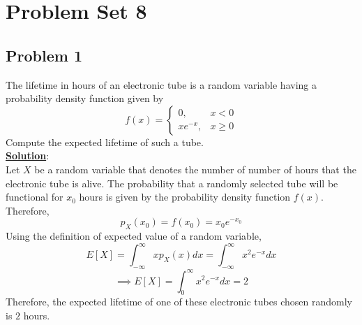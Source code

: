 \documentclass[11pt,letter paper]{report}
\begin{document}
%
\section*{Problem Set 8}

\subsection*{Problem 1}
The lifetime in hours of an electronic tube is a random variable having a probability density function given by 
$$f(x)=\begin{cases}
0,& x<0\\
xe^{-x},& x\geq 0
\end{cases}$$
Compute the expected lifetime of such a tube.\\[0.1cm]
{\bf \underline{Solution}}:\\
Let $X$ be a random variable that denotes the number of number of hours that the electronic tube is alive. The probability that a randomly selected tube will be functional for $x_0$ hours is given by the probability density function $f(x)$. Therefore, 
$$p_X(x_0)=f(x_0)=x_0e^{-x_0}$$
Using the definition of expected value of a random variable, 
$$E[X]=\int_{-\infty}^{\infty}xp_X(x)dx=\int_{-\infty}^{\infty}x^2e^{-x}dx$$
$$\implies E[X]=\int_0^{\infty}x^2e^{-x}dx=2$$
Therefore, the expected lifetime of one of these electronic tubes chosen randomly is \underline{\underline{$2$}} hours.

\end{document}
